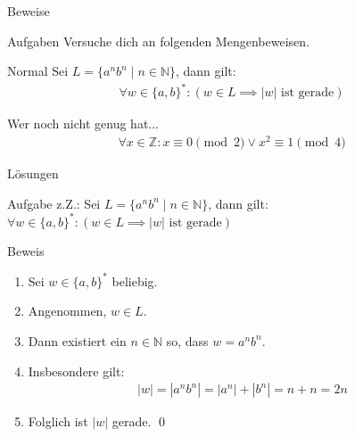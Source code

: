 {
\begin{frame}[fragile]{Beweise}
    \begin{alertblock}{Aufgaben}
        Versuche dich an folgenden Mengenbeweisen.
    \end{alertblock}
    \begin{block}{Normal}
        Sei $L = \{a^nb^n \mid n \in \mathbb{N}\}$, dann gilt:
        \begin{align*}
            \forall w \in \{a, b\}^*: \left(w \in L \implies |w| \text{ ist gerade}\right)
        \end{align*}
    \end{block}
    \begin{block}{Wer noch nicht genug hat...}
        \begin{align*}
            \forall x \in \mathbb{Z}: x \equiv 0 \pmod{2} \vee x^2 \equiv 1 \pmod{4}
        \end{align*}
    \end{block}
\end{frame}
}

{
\begin{frame}[fragile]{Lösungen}
    \begin{alertblock}{Aufgabe}
		z.Z.: Sei $L = \{a^nb^n \mid n \in \mathbb{N}\}$, dann gilt:\\
		$\forall w \in \{a, b\}^*: \left(w \in L \implies |w| \text{ ist gerade}\right)$
	\end{alertblock}
    \begin{alertblock}{Beweis}
    	\begin{enumerate}
    		\item<1-> Sei $w \in \{a,b\}^*$ beliebig.\\
    		\item<2-> Angenommen,  $w \in L$.\\
    		\item<3-> Dann existiert ein $n \in \mathbb{N}$ so, dass $w = a^nb^n$.\\
    		\item<4-> Insbesondere gilt:
    		\begin{align*}
    		|w| = |a^nb^n| = |a^n| + |b^n| = n+n = 2n 
    		\end{align*}
    		\item<5-> Folglich ist $|w|$ gerade. \qed
    	\end{enumerate}
    \end{alertblock}
\end{frame}
}


